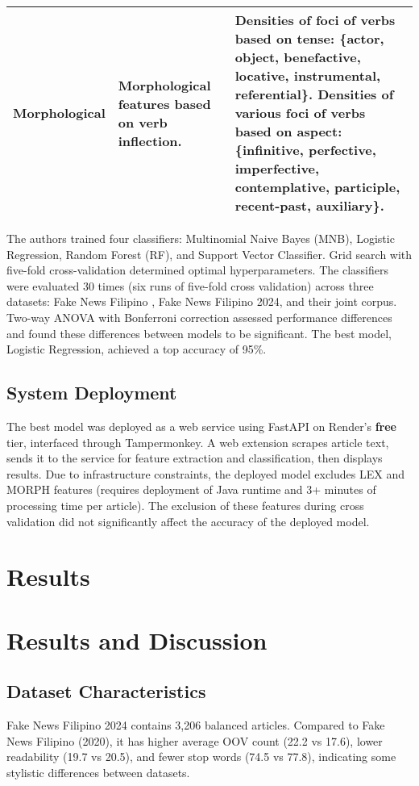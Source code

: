 \documentclass[conference]{IEEEtran}
\begin{document}
\begin{table*}[!t]
\begin{tabular}{|p{}|p{}|p{}|}
Morphological & Morphological features based on verb inflection. & Densities of foci of verbs based on tense: \{actor, object, benefactive, locative, instrumental, referential\}. Densities of various foci of verbs based on aspect: \{infinitive, perfective, imperfective, contemplative, participle, recent-past, auxiliary\}. \\ \hline

\end{tabular}
\end{table*}

The authors trained four classifiers: Multinomial Naive Bayes (MNB), Logistic Regression, Random Forest (RF), and Support Vector Classifier. Grid search with five-fold cross-validation determined optimal hyperparameters. The classifiers were evaluated 30 times (six runs of five-fold cross validation) across three datasets: Fake News Filipino \cite{b3}, Fake News Filipino 2024, and their joint corpus. Two-way ANOVA with Bonferroni correction assessed performance differences and found these differences between models to be significant. The best model, Logistic Regression, achieved a top accuracy of 95\%.

\subsection{System Deployment}
The best model was deployed as a web service using FastAPI on Render's \textbf{free} tier, interfaced through Tampermonkey. A web extension scrapes article text, sends it to the service for feature extraction and classification, then displays results. Due to infrastructure constraints, the deployed model excludes LEX and MORPH features (requires deployment of Java runtime and 3+ minutes of processing time per article). The exclusion of these features during cross validation did not significantly affect the accuracy of the deployed model.

\section{Results}

\section{Results and Discussion}

\subsection{Dataset Characteristics}
Fake News Filipino 2024 contains 3,206 balanced articles. Compared to Fake News Filipino (2020), it has higher average OOV count (22.2 vs 17.6), lower readability (19.7 vs 20.5), and fewer stop words (74.5 vs 77.8), indicating some stylistic differences between datasets.
\end{document}
